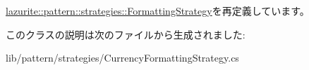 \hyperlink{classlazurite_1_1pattern_1_1strategies_1_1_formatting_strategy_a038a894580ec88e41ae22efead88c6e9}{lazurite::pattern::strategies::FormattingStrategy}を再定義しています。

このクラスの説明は次のファイルから生成されました:\begin{DoxyCompactItemize}
\item 
lib/pattern/strategies/CurrencyFormattingStrategy.cs\end{DoxyCompactItemize}
